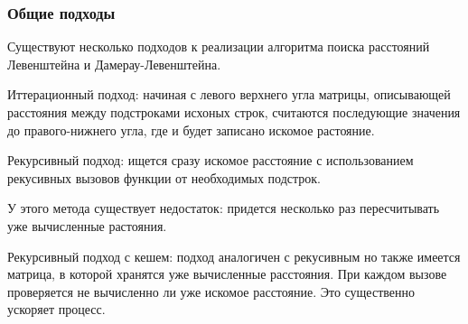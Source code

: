 \subsubsection{Общие подходы}
Существуют несколько подходов к реализации алгоритма поиска расстояний Левенштейна и Дамерау-Левенштейна.\par
Иттерационный подход: начиная с левого верхнего угла матрицы, описывающей расстояния между подстроками исхоных строк, 
считаются последующие значения до правого-нижнего угла, где и будет записано искомое растояние.\par
\pagebreak
Рекурсивный подход: ищется сразу искомое расстояние с использованием рекусивных вызовов функции от необходимых подстрок.\par
У этого метода существует недостаток: придется несколько раз пересчитывать уже вычисленные растояния.\par
Рекурсивный подход с кешем: подход аналогичен с рекусивным но также имеется матрица, в которой хранятся уже вычисленные расстояния.
При каждом вызове проверяется не вычисленно ли уже искомое расстояние. Это существенно ускоряет процесс.

\pagebreak